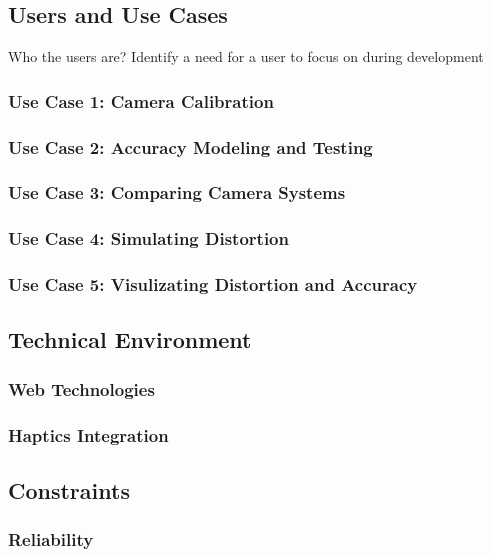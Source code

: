 \documentclass[11pt]{report}
\begin{document}
\subsection{Users and Use Cases} 

Who the users are? Identify a need for a user to focus on during development 


\subsubsection{Use Case 1: Camera Calibration}

\subsubsection{Use Case 2: Accuracy Modeling and Testing} 

\subsubsection{Use Case 3: Comparing Camera Systems} 

\subsubsection{Use Case 4: Simulating Distortion } 

\subsubsection{Use Case 5: Visulizating Distortion and Accuracy}
 
 
\subsection{Technical Environment}

\subsubsection{Web Technologies}

\subsubsection{Haptics Integration}
 
\subsection{Constraints}

\subsubsection{Reliability}
\end{document}

